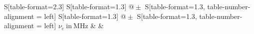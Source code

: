 \begin{table}[h!]
    \centering
    \caption{Frequenzen $\nu_e$ und dazugehörige erdmagnetfeld-bereinigte Flussdichten $B$ der Helmholtz-Spulen, sowie das berechnete Erdmagnetfeld $B_\text{Erde}$}
    \label{tab:BFeld}
    \begin{tabular}{
	S[table-format=2.3]
	S[table-format=1.3]
	@{${}\pm{}$}
	S[table-format=1.3, table-number-alignment = left]
	S[table-format=1.3]
	@{${}\pm{}$}
	S[table-format=1.3, table-number-alignment = left]
	}
	\toprule
	{$\nu_e \ \mathrm{in} \ \si{\mega\hertz}$}		& 		& 
			\\ 
	\midrule
    
    \bottomrule
    \end{tabular}
    \end{table}
